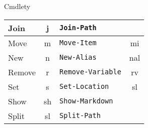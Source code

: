 \documentclass[main.tex]{subfiles}
\begin{document}
\begin{frame}[allowframebreaks]{Cmdlety}
\begin{center}
\begin{tabular}{|l|c|l|c|}
    \hline
    Join & j & \texttt{Join-Path} & \\
    \hline
    Move & m & \texttt{Move-Item} & mi \\
    \hline
    New & n & \texttt{New-Alias} & nal \\
    \hline
    Remove & r & \texttt{Remove-Variable} & rv \\
    \hline
    Set & s & \texttt{Set-Location} & sl\\
    \hline
    Show & sh & \texttt{Show-Markdown} & \\
    \hline
    Split & sl & \texttt{Split-Path} & \\
    \hline
  \end{tabular}
\end{center}
\end{frame}
\end{document}
